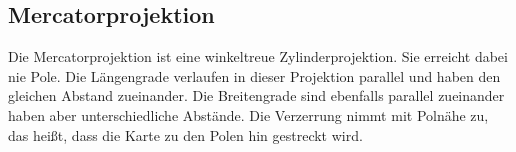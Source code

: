 \subsection{Mercatorprojektion}
\label{sec:mercator} 
Die Mercatorprojektion ist eine winkeltreue Zylinderprojektion. Sie erreicht dabei nie Pole.
Die Längengrade verlaufen in dieser Projektion parallel und haben den gleichen Abstand zueinander.
Die Breitengrade sind ebenfalls parallel zueinander haben aber unterschiedliche Abstände.
Die Verzerrung nimmt mit Polnähe zu, das heißt, dass die Karte zu den Polen hin gestreckt wird.